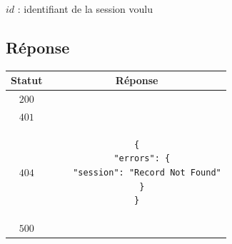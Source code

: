 \documentclass[titlepage, 12pt]{report}
\begin{document}
\par $ id $ : identifiant de la session voulu
\subsection{Réponse}

\begin{center}
	\begin{tabular}{|c|c|}
		\hline
		Statut & Réponse \\
		\hline
		$ 200 $ & \\ 
		\hline
		$ 401 $ & \\
		\hline
		$ 404 $ & \begin{lstlisting}
{
  "errors": {
    "session": "Record Not Found"
  }
}
		\end{lstlisting} \\
		\hline
		$ 500 $ & \\
		\hline
	\end{tabular}
\end{center}
\end{document}
